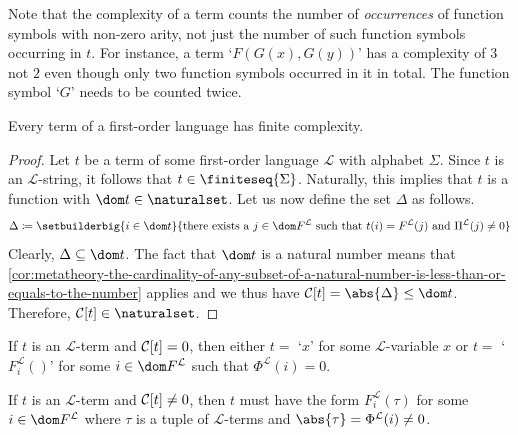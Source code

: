 \begin{rem}
    Note that the complexity of a term counts the number of \emph{occurrences} of function symbols with non-zero arity, not just the number of such function symbols occurring
    in \( t \). For instance, a term `\( F(G(x), G(y)) \)' has a complexity of \( 3 \) not \( 2 \) even though only two function symbols occurred in it in total.
    The function symbol `\( G \)' needs to be counted twice.
\end{rem}

\begin{thm}
     \label{thm:first-order-language-every-term-has-finite-complexity}
    Every term of a first-order language has finite complexity.
\end{thm}

\begin{proof}
    Let \( t \) be a term of some first-order language \( \mathcal{L} \) with alphabet \( \Sigma \).
    Since \( t \) is an \( \mathcal{L} \)-string, it follows that \( t \in \finiteseq{\Sigma} \).
    Naturally, this implies that \( t \) is a function with \( \dom t \in \naturalset \).
    Let us now define the set \( \Delta \) as follows.
    \begin{equation*}
        \Delta \coloneq \setbuilderbig{i \in \dom t}{ \text{there exists a \( j \in \dom F^{\mathcal{L}} \) such that } t(i) = F^{\mathcal{L}}(j) \ \text{and} \ \Pi^{\mathcal{L}}(j) \neq 0 }
    \end{equation*}
    Clearly, \( \Delta \subseteq \dom t \).
    The fact that \( \dom t \) is a natural number means that
    \cref{cor:metatheory-the-cardinality-of-any-subset-of-a-natural-number-is-less-than-or-equals-to-the-number}
    applies and we thus have \( \folcomplexityofterm{t} = \abs{\Delta} \leq \dom t \).
    Therefore, \( \folcomplexityofterm{t} \in \naturalset \).
\end{proof}

\begin{cor}
     \label{cor:first-order-language-terms-with-zero-complexity-is-either-a-variable-or-0-ary-function-symbol}
    If \( t \) is an \( \mathcal{L} \)-term and \( \folcomplexityofterm{t} = 0 \), then either \( t = \) `\( x \)' for some \( \mathcal{L} \)-variable \( x \)
    or \( t = \) `\( F^{\mathcal{L}}_{i}() \)' for some \( i \in \dom F^{\mathcal{L}} \) such that \( \Phi^{\mathcal{L}}(i) = 0 \).
\end{cor}

\begin{cor}
     \label{cor:first-order-language-terms-with-non-zero-complexity-must-have-a-parent-function-symbol}
    If \( t \) is an \( \mathcal{L} \)-term and \( \folcomplexityofterm{t} \neq 0 \), then \( t \) must have the form
    \( F^{\mathcal{L}}_{i}(\tau) \) for some \( i \in \dom F^{\mathcal{L}} \) where \( \tau \) is a tuple of \( \mathcal{L} \)-terms
    and \( \abs{\tau} = \Phi^{\mathcal{L}}(i) \neq 0 \).
\end{cor}


